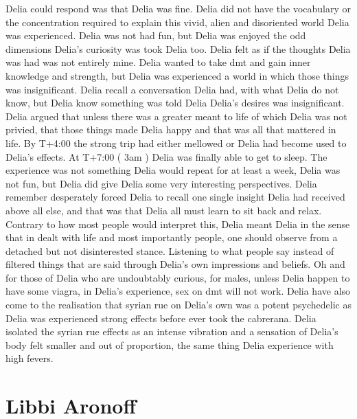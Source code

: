 \documentclass[12pt]{book}
\begin{document}
Delia could respond was that Delia was fine. Delia did not have the vocabulary or the concentration required to explain this vivid, alien and disoriented world Delia was experienced. Delia was not had fun, but Delia was enjoyed the odd dimensions Delia's curiosity was took Delia too. Delia felt as if the thoughts Delia was had was not entirely mine. Delia wanted to take dmt and gain inner knowledge and strength, but Delia was experienced a world in which those things was insignificant. Delia recall a conversation Delia had, with what Delia do not know, but Delia know something was told Delia Delia's desires was insignificant. Delia argued that unless there was a greater meant to life of which Delia was not privied, that those things made Delia happy and that was all that mattered in life. By T+4:00 the strong trip had either mellowed or Delia had become used to Delia's effects. At T+7:00 ( 3am ) Delia was finally able to get to sleep. The experience was not something Delia would repeat for at least a week, Delia was not fun, but Delia did give Delia some very interesting perspectives. Delia remember desperately forced Delia to recall one single insight Delia had received above all else, and that was that Delia all must learn to sit back and relax. Contrary to how most people would interpret this, Delia meant Delia in the sense that in dealt with life and most importantly people, one should observe from a detached but not disinterested stance. Listening to what people say instead of filtered things that are said through Delia's own impressions and beliefs. Oh and for those of Delia who are undoubtably curious, for males, unless Delia happen to have some viagra, in Delia's experience, sex on dmt will not work. Delia have also come to the realisation that syrian rue on Delia's own was a potent psychedelic as Delia was experienced strong effects before ever took the cabrerana. Delia isolated the syrian rue effects as an intense vibration and a sensation of Delia's body felt smaller and out of proportion, the same thing Delia experience with high fevers.



\chapter{Libbi Aronoff}
\end{document}
